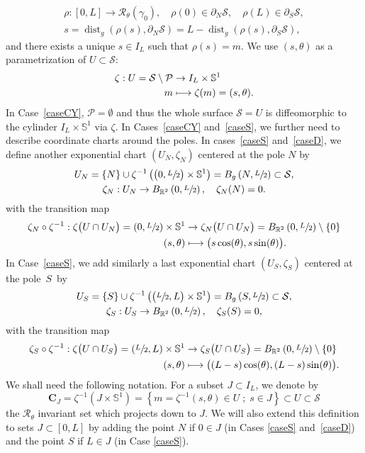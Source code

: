 \documentclass[10pt]{amsart}
\newcommand\mto{\mathchoice{\longmapsto}{\mapsto}{\mapsto}{\mapsto}}
\newcommand{\sep}{\;;\;}
\theoremstyle{definition}
\newcommand{\calR}{\ensuremath{\mathcal R}}
\renewcommand{\P}{\ensuremath{\mathcal P}}
\newcommand{\calS}{\ensuremath{\mathcal S}}
\newcommand{\mb}[1]{\ensuremath{\mathbb{#1}}}
\newcommand{\R}{{\mb{R}}}
\newcommand{\bS}{\ensuremath{\mathbb S}}
\DeclareMathOperator{\dist}{dist}
\let\d\partial
\newcommand\CO[1]{\boldsymbol{C}_{\!#1}}
\begin{document}
\begin{gather*}
\rho : [0,L]\to \calR_\theta (\gamma_0), \quad \rho (0) \in \d_N \calS, \quad \rho (L) \in \d_S \calS, \\
s = \dist_g( \rho(s), \d_N \calS) = L- \dist_g( \rho(s), \d_S \calS),
\end{gather*}
and there exists a unique $s \in I_L$ such that $\rho(s) = m$. We use $(s,\theta)$ as a parametrization of $U \subset \calS$:
\begin{align*}
\zeta : U = \mathcal{S} \setminus \P& \to I_L \times \bS^1\\
m& \mto \zeta(m) = (s, \theta).
\end{align*}
In Case~\ref{caseCY}, $\P=\emptyset$ and thus the whole surface $\calS = U$ is diffeomorphic to the cylinder $I_L \times \bS^1$ via $\zeta$.
In Cases~\ref{caseCY} and~\ref{caseS}, we further need to describe coordinate charts around the poles.
In cases~\ref{caseS} and~\ref{caseD}, we define another exponential chart $(U_N, \zeta_N)$ centered at the pole $N$ by
\begin{gather*}
U_N = \{N\} \cup \zeta^{-1} \left( \big( 0, \sfrac{L}{2} \big) \times \bS^1 \right) = B_g\left(N, \sfrac{L}{2}\right) \subset \calS,
\\ \zeta_N : U_N \to B_{\R^2}\left(0, \sfrac{L}{2}\right), \quad \zeta_N (N) = 0.
\end{gather*}
with the transition map
\begin{align*}
\zeta_N \circ \zeta^{-1} : \zeta \big(U\cap U_N \big) = \left( 0,\sfrac{L}{2} \right) \times \bS^1 & \to \zeta_N \big(U\cap U_N \big) = B_{\R^2}\left(0, \sfrac{L}{2}\right) \setminus \{ 0 \}\\
(s,\theta)& \mto \big(s \cos(\theta), s \sin (\theta) \big).
\end{align*}
In Case~\ref{caseS}, we add similarly a last exponential chart $(U_S, \zeta_S)$ centered at the pole~$S$~by
\begin{gather*}
U_S = \{S\} \cup \zeta^{-1} \left( \big( \sfrac{L}{2}, L \big) \times \bS^1 \right) = B_g\left(S, \sfrac{L}{2}\right) \subset \calS,
\\ \zeta_S : U_S \to B_{\R^2}\left(0, \sfrac{L}{2}\right), \quad \zeta_S (S) = 0,
\end{gather*}
with the transition map
\begin{align*}
\zeta_S \circ \zeta^{-1} : \zeta \big(U\cap U_S \big) = \left(\sfrac{L}{2}, L \right) \times \bS^1 & \to \zeta_S \big(U\cap U_S \big) = B_{\R^2}\left(0, \sfrac{L}{2}\right) \setminus \{ 0 \}\\
(s,\theta)& \mto \big((L-s) \cos(\theta), (L-s) \sin (\theta) \big).
\end{align*}
We shall need the following notation. For a subset $J\subset I_L$, we denote by
\[
\CO{J}=\zeta^{-1}(J\times\bS^1) = \left\{m=\zeta^{-1}(s,\theta)\in U\sep s\in J\right\} \subset U\subset \calS
\]
the $\calR_\theta$ invariant set which projects down to $J$.
We will also extend this definition to sets $J\subset [0,L]$ by adding the point $N$ if $0\in J$ (in Cases \ref{caseS} and~\ref{caseD}) and the point $S$ if $L\in J$ (in Case \ref{caseS}).
\end{document}
